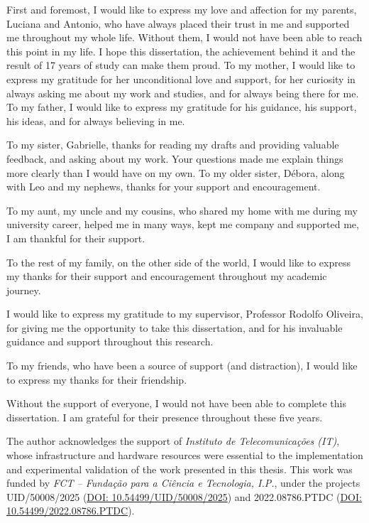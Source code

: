 
%

\begin{ntacknowledgements}

First and foremost, I would like to express my love and affection for my parents, Luciana and Antonio, who have always placed their trust in me and supported me throughout my whole life. Without them, I would not have been able to reach this point in my life. I hope this dissertation, the achievement behind it and the result of 17 years of study can make them proud. To my mother, I would like to express my gratitude for her unconditional love and support, for her curiosity in always asking me about my work and studies, and for always being there for me. To my father, I would like to express my gratitude for his guidance, his support, his ideas, and for always believing in me.

To my sister, Gabrielle, thanks for reading my drafts and providing valuable feedback, and asking about my work. Your questions made me explain things more clearly than I would have on my own. To my older sister, Débora, along with Leo and my nephews, thanks for your support and encouragement. 

To my aunt, my uncle and my cousins, who shared my home with me during my university career, helped me in many ways, kept me company and supported me, I am thankful for their support.

To the rest of my family, on the other side of the world, I would like to express my thanks for their support and encouragement throughout my academic journey.  

I would like to express my gratitude to my supervisor, Professor Rodolfo Oliveira, for giving me the opportunity to take this dissertation, and for his invaluable guidance and support throughout this research.  

To my friends, who have been a source of support (and distraction), I would like to express my thanks for their friendship.

Without the support of everyone, I would not have been able to complete this dissertation. I am grateful for their presence throughout these five years.

The author acknowledges the support of \emph{Instituto de Telecomunicações (IT)}, whose infrastructure and hardware resources were essential to the implementation and experimental validation of the work presented in this thesis. This work was funded by \emph{FCT – Fundação para a Ciência e Tecnologia, I.P.}, under the projects UID/50008/2025 (\href{https://doi.org/10.54499/UID/50008/2025}{DOI: 10.54499/UID/50008/2025}) and 2022.08786.PTDC (\href{https://doi.org/10.54499/2022.08786.PTDC}{DOI: 10.54499/2022.08786.PTDC}).
\end{ntacknowledgements}